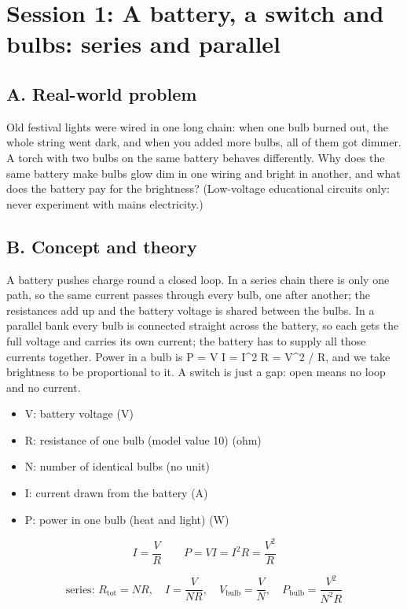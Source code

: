 \documentclass[11pt,a4paper]{article}
\begin{document}
\section{Session 1: A battery, a switch and bulbs: series and parallel}

\subsection*{A. Real-world problem}
Old festival lights were wired in one long chain: when one bulb burned out, the whole string went dark, and when you added more bulbs, all of them got dimmer. A torch with two bulbs on the same battery behaves differently. Why does the same battery make bulbs glow dim in one wiring and bright in another, and what does the battery pay for the brightness? (Low-voltage educational circuits only: never experiment with mains electricity.)

\subsection*{B. Concept and theory}
A battery pushes charge round a closed loop. In a series chain there is only one path, so the same current passes through every bulb, one after another; the resistances add up and the battery voltage is shared between the bulbs. In a parallel bank every bulb is connected straight across the battery, so each gets the full voltage and carries its own current; the battery has to supply all those currents together. Power in a bulb is P = V I = I\textasciicircum{}2 R = V\textasciicircum{}2 / R, and we take brightness to be proportional to it. A switch is just a gap: open means no loop and no current.

\begin{itemize}[nosep]
\item V: battery voltage (V)
\item R: resistance of one bulb (model value 10) (ohm)
\item N: number of identical bulbs (no unit)
\item I: current drawn from the battery (A)
\item P: power in one bulb (heat and light) (W)
\end{itemize}

\begin{equation*}
I=\frac{V}{R}\qquad P=VI=I^2R=\frac{V^2}{R}
\end{equation*}

\begin{equation*}
\text{series: } R_{\mathrm{tot}}=NR,\quad I=\frac{V}{NR},\quad V_{\mathrm{bulb}}=\frac{V}{N},\quad P_{\mathrm{bulb}}=\frac{V^2}{N^2R}
\end{equation*}
\end{document}
